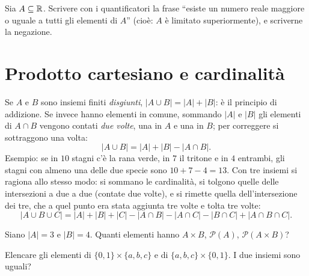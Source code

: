 \begin{esercizio}[\liv{2}]
Sia $A\subseteq\mathbb R$. Scrivere con i quantificatori la frase ``esiste un numero reale maggiore o uguale a tutti gli elementi di $A$'' (cioè: $A$ è limitato superiormente), e scriverne la negazione.
\end{esercizio}

\section{Prodotto cartesiano e cardinalit\`a}

\begin{vuoto}{}
Se $A$ e $B$ sono insiemi finiti \emph{disgiunti}, $|A\cup B|=|A|+|B|$: è il principio di addizione. Se invece hanno elementi in comune, sommando $|A|$ e $|B|$ gli elementi di $A\cap B$ vengono contati \emph{due volte}, una in $A$ e una in $B$; per correggere si sottraggono una volta:
\[
|A\cup B|=|A|+|B|-|A\cap B| .
\]
Esempio: se in $10$ stagni c'è la rana verde, in $7$ il tritone e in $4$ entrambi, gli stagni con almeno una delle due specie sono $10+7-4=13$. Con tre insiemi si ragiona allo stesso modo: si sommano le cardinalità, si tolgono quelle delle intersezioni a due a due (contate due volte), e si rimette quella dell'intersezione dei tre, che a quel punto era stata aggiunta tre volte e tolta tre volte:
\[
|A\cup B\cup C|=|A|+|B|+|C|-|A\cap B|-|A\cap C|-|B\cap C|+|A\cap B\cap C| .
\]
\end{vuoto}

\begin{esercizio}[\liv{1}]
Siano $|A|=3$ e $|B|=4$. Quanti elementi hanno $A\times B$, $\mathcal P(A)$, $\mathcal P(A\times B)$?
\end{esercizio}

\begin{esercizio}[\liv{1}]
Elencare gli elementi di $\{0,1\}\times\{a,b,c\}$ e di $\{a,b,c\}\times\{0,1\}$. I due insiemi sono uguali?
\end{esercizio}

